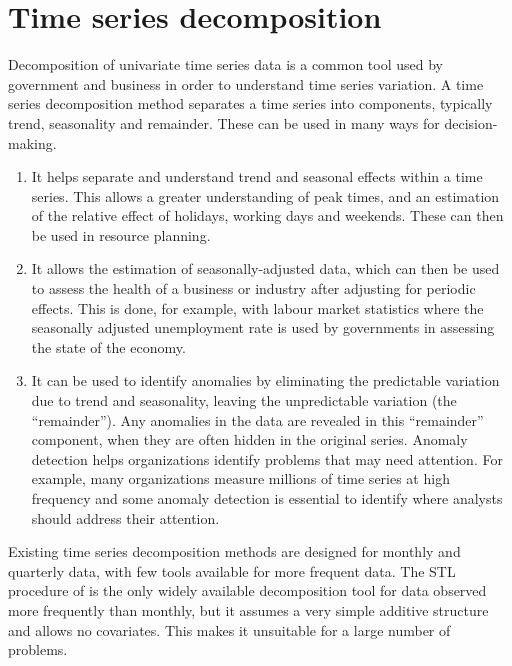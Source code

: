 \documentclass[ijds,nonblindrev]{informs-ijds}
\providecommand{\tightlist}{%
  \setlength{\itemsep}{0pt}\setlength{\parskip}{0pt}}
\begin{document}
\section{Time series decomposition}\label{time-series-decomposition}

Decomposition of univariate time series data is a common tool used by government and business in order to understand time series variation. A time series decomposition method separates a time series into components, typically trend, seasonality and remainder. These can be used in many ways for decision-making.

\begin{enumerate}
\def\labelenumi{\arabic{enumi}.}
\tightlist
\item
  It helps separate and understand trend and seasonal effects within a time series. This allows a greater understanding of peak times, and an estimation of the relative effect of holidays, working days and weekends. These can then be used in resource planning.
\item
  It allows the estimation of seasonally-adjusted data, which can then be used to assess the health of a business or industry after adjusting for periodic effects. This is done, for example, with labour market statistics where the seasonally adjusted unemployment rate is used by governments in assessing the state of the economy.
\item
  It can be used to identify anomalies by eliminating the predictable variation due to trend and seasonality, leaving the unpredictable variation (the ``remainder''). Any anomalies in the data are revealed in this ``remainder'' component, when they are often hidden in the original series. Anomaly detection helps organizations identify problems that may need attention. For example, many organizations measure millions of time series at high frequency and some anomaly detection is essential to identify where analysts should address their attention.
\end{enumerate}

Existing time series decomposition methods are designed for monthly and quarterly data, with few tools available for more frequent data. The STL procedure of \citet{cleveland1990stl} is the only widely available decomposition tool for data observed more frequently than monthly, but it assumes a very simple additive structure and allows no covariates. This makes it unsuitable for a large number of problems.
\end{document}
